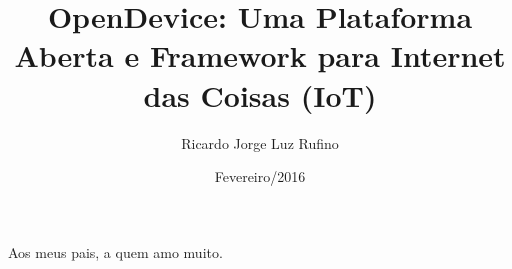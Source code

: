 \documentclass[pt,oneside,onehalfspacing,msc]{risethesis}
\title{OpenDevice: Uma Plataforma Aberta e Framework para Internet das Coisas (IoT)}
\date{Fevereiro/2016}
\author{Ricardo Jorge Luz Rufino}
\begin{document}
\frontmatter
\frontpage
\presentationpage

\begin{dedicatory}
Aos meus pais, a quem amo muito.
\end{dedicatory}








\resumo
\thispagestyle{empty}


\abstract
\thispagestyle{empty}


\tableofcontents

\listoffigures

\listoftables

\listofacronyms


\setlength{\parskip}{3 mm}

\mainmatter
\setcounter{page}{1}







\backmatter
\clearpage
{}

%
\renewcommand{\bibname}{Referências} 


\clearpage
\addappheadtotoc
\appendix
\appendixpage

%
%
\end{document}
